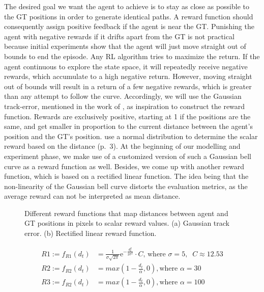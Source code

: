 The desired goal we want the agent to achieve is to stay as close as possible to the GT positions in order to generate identical paths. A reward function should consequently assign positive feedback if the agent is near the GT. Punishing the agent with negative rewards if it drifts apart from the GT is not practical because initial experiments show that the agent will just move straight out of bounds to end the episode. Any RL algorithm tries to maximize the return. If the agent continuous to explore the state space, it will repeatedly receive negative rewards, which accumulate to a high negative return. However, moving straight out of bounds will result in a return of a few negative rewards, which is greater than any attempt to follow the curve. Accordingly, we will use the Gaussian track-error, mentioned in the work of \cite{martinsen2018curved}, as inspiration to construct the reward function. Rewards are exclusively positive, starting at 1 if the positions are the same, and get smaller in proportion to the current distance between the agent's position and the GT's position. \cite{martinsen2018curved} use a normal distribution to determine the scalar reward based on the distance (p.~3). At the beginning of our modelling and experiment phase, we make use of a customized version of such a Gaussian bell curve as a reward function as well. Besides, we come up with another reward function, which is based on a rectified linear function. The idea being that the non-linearity of the Gaussian bell curve distorts the evaluation metrics, as the average reward can not be interpreted as mean distance. 

\begin{figure}[H]
    \centering
    \begin{subfigure}[b]{0.49\textwidth}
        \centering
        
        \caption{}
        \label{fig:reward1}
    \end{subfigure}
    \hfill
    \begin{subfigure}[b]{0.49\textwidth}
        \centering
        
        \caption{}
        \label{fig:reward2}
    \end{subfigure}
    \caption{Different reward functions that map distances between agent and GT positions in pixels to scalar reward values. (a) Gaussian track error. (b) Rectified linear reward function.}
    \label{fig:rewardFunctions}
\end{figure}


\begin{equation}
\begin{aligned}
    R1 := f_{R1}(d_t) &= \frac{1}{\sigma \sqrt{2\pi}} \mathrm{e}^{-\frac{d_t^2}{2\sigma^2}} \cdot C \text{, where $\sigma = 5, \;\; C \approx 12.53$}
\\
R2 := f_{R2}(d_t) &= max(1 - \frac{d_t}{\alpha}, 0) , \text{where $\alpha = 30$}
\\
R3 := f_{R2}(d_t) &= max(1 - \frac{d_t}{\alpha}, 0) , \text{where $\alpha = 100$}
    \end{aligned}
\end{equation}\label{eq:rewardFunctions}
